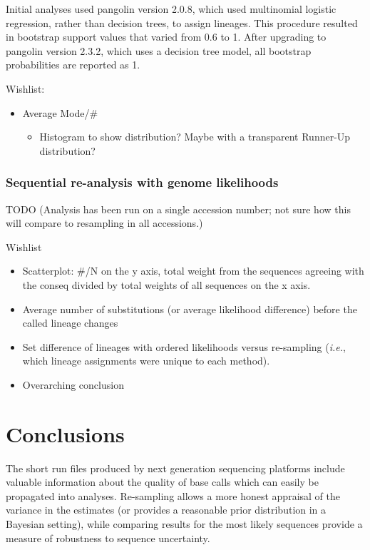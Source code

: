 \documentclass[
]{article}
\providecommand{\tightlist}{%
  \setlength{\itemsep}{0pt}\setlength{\parskip}{0pt}}
\newcommand{\ie}{\textit{i.e.},\xspace}
\begin{document}
Initial analyses used pangolin version 2.0.8, which used multinomial
logistic regression, rather than decision trees, to assign lineages.
This procedure resulted in bootstrap support values that varied from 0.6
to 1. After upgrading to pangolin version 2.3.2, which uses a decision
tree model, all bootstrap probabilities are reported as 1.

Wishlist:

\begin{itemize}
\tightlist
\item
  Average Mode/\#

  \begin{itemize}
  \tightlist
  \item
    Histogram to show distribution? Maybe with a transparent Runner-Up
    distribution?
  \end{itemize}
\end{itemize}

\hypertarget{sequential-re-analysis-with-genome-likelihoods}{%
\subsubsection{Sequential re-analysis with genome
likelihoods}\label{sequential-re-analysis-with-genome-likelihoods}}

TODO (Analysis has been run on a single accession number; not sure how
this will compare to resampling in all accessions.)

Wishlist

\begin{itemize}
\tightlist
\item
  Scatterplot: \#/N on the y axis, total weight from the sequences
  agreeing with the conseq divided by total weights of all sequences on
  the x axis.
\item
  Average number of substitutions (or average likelihood difference)
  before the called lineage changes
\item
  Set difference of lineages with ordered likelihoods versus re-sampling
  (\ie which lineage assignments were unique to each method).
\item
  Overarching conclusion
\end{itemize}

\hypertarget{conclusions}{%
\section{Conclusions}\label{conclusions}}

The short run files produced by next generation sequencing platforms
include valuable information about the quality of base calls which can
easily be propagated into analyses. Re-sampling allows a more honest
appraisal of the variance in the estimates (or provides a reasonable
prior distribution in a Bayesian setting), while comparing results for
the most likely sequences provide a measure of robustness to sequence
uncertainty.
\end{document}
